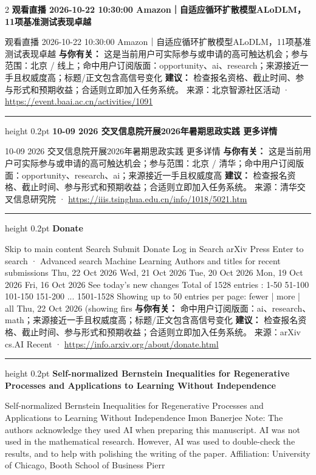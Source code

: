 \documentclass[10.5pt]{ctexart}
\begin{document}
\begin{multicols}{2}
{\large\bfseries 观看直播 2026-10-22 10:30:00 Amazon｜自适应循环扩散模型ALoDLM，11项基准测试表现卓越}\par
观看直播 2026-10-22 10:30:00 Amazon｜自适应循环扩散模型ALoDLM，11项基准测试表现卓越
\textbf{与你有关：} 这是当前用户可实际参与或申请的高可触达机会；参与范围：北京 / 线上；命中用户订阅版面：opportunity、ai、research；来源接近一手且权威度高；标题/正文包含高信号变化
\textbf{建议：} 检查报名资格、截止时间、参与形式和预期收益；合适则立即加入任务系统。
{\footnotesize\color{ormuted} 来源：北京智源社区活动 · \url{https://event.baai.ac.cn/activities/1091}}
\vspace{2mm}
\hrule height 0.2pt
\vspace{2mm}
{\large\bfseries 10-09 2026 交叉信息院开展2026年暑期思政实践 更多详情}\par
10-09 2026 交叉信息院开展2026年暑期思政实践 更多详情
\textbf{与你有关：} 这是当前用户可实际参与或申请的高可触达机会；参与范围：北京 / 清华；命中用户订阅版面：opportunity、research、ai；来源接近一手且权威度高
\textbf{建议：} 检查报名资格、截止时间、参与形式和预期收益；合适则立即加入任务系统。
{\footnotesize\color{ormuted} 来源：清华交叉信息研究院 · \url{https://iiis.tsinghua.edu.cn/info/1018/5021.htm}}
\vspace{2mm}
\hrule height 0.2pt
\vspace{2mm}
{\large\bfseries Donate}\par
Skip to main content Search Submit Donate Log in Search arXiv Press Enter to search · Advanced search Machine Learning Authors and titles for recent submissions Thu, 22 Oct 2026 Wed, 21 Oct 2026 Tue, 20 Oct 2026 Mon, 19 Oct 2026 Fri, 16 Oct 2026 See today's new changes Total of 1528 entries : 1-50 51-100 101-150 151-200 ... 1501-1528 Showing up to 50 entries per page: fewer | more | all Thu, 22 Oct 2026 (showing firs
\textbf{与你有关：} 命中用户订阅版面：ai、research、math；来源接近一手且权威度高；标题/正文包含高信号变化
\textbf{建议：} 检查报名资格、截止时间、参与形式和预期收益；合适则立即加入任务系统。
{\footnotesize\color{ormuted} 来源：arXiv cs.AI Recent · \url{https://info.arxiv.org/about/donate.html}}
\vspace{2mm}
\hrule height 0.2pt
\vspace{2mm}
{\large\bfseries Self-normalized Bernstein Inequalities for Regenerative Processes and Applications to Learning Without Independence}\par
Self-normalized Bernstein Inequalities for Regenerative Processes and Applications to Learning Without Independence Imon Banerjee Note: The authors acknowledge they used AI when preparing this manuscript. AI was not used in the mathematical research. However, AI was used to double-check the results, and to help with polishing the writing of the paper. Affiliation: University of Chicago, Booth School of Business Pierr

\end{multicols}
\end{document}
